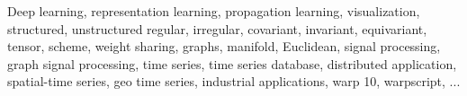 \begin{keywords}
Deep learning,
representation learning,
propagation learning,
visualization,
structured,
unstructured regular,
irregular,
covariant,
invariant,
equivariant,
tensor,
scheme,
weight sharing,
graphs,
manifold,
Euclidean,
signal processing,
graph signal processing,
time series,
time series database,
distributed application,
spatial-time series,
geo time series,
industrial applications,
warp 10,
warpscript,
...
\end{keywords}